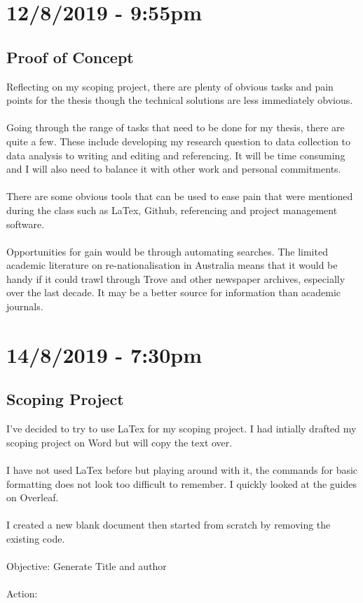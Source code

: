 \documentclass{article}
\begin{document}
\section*{12/8/2019 - 9:55pm}
\subsection*{Proof of Concept}
Reflecting on my scoping project, there are plenty of obvious tasks and pain points for the thesis though the technical solutions are less immediately obvious.\\\\
Going through the range of tasks that need to be done for my thesis, there are quite a few. These include developing my research question to data collection to data analysis to writing and editing and referencing. It will be time consuming and I will also need to balance it with other work and personal commitments.\\\\
There are some obvious tools that can be used to ease pain that were mentioned during the class such as LaTex, Github, referencing and project management software.\\\\
Opportunities for gain would be through automating searches. The limited academic literature on re-nationalisation in Australia means that it would be handy if it could trawl through Trove and other newspaper archives, especially over the last decade. It may be a better source for information than academic journals.
\section*{14/8/2019 - 7:30pm}
\subsection*{Scoping Project}
I’ve decided to try to use LaTex for my scoping project. I had intially drafted my scoping project on Word but will copy the text over.\\\\
I have not used LaTex before but playing around with it, the commands for basic formatting does not look too difficult to remember. I quickly looked at the guides on Overleaf.\\\\
I created a new blank document then started from scratch by removing the existing code.\\\\
Objective: Generate Title and author\\\\
Action:
\end{document}
